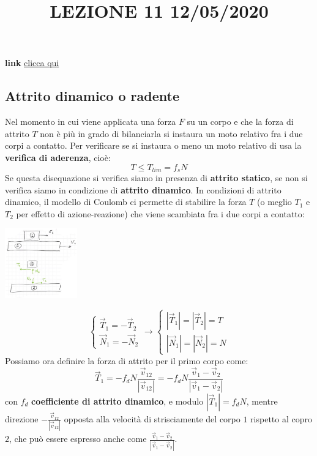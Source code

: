 \title{LEZIONE 11 12/05/2020}\newline
\textbf{link} \href{https://web.microsoftstream.com/video/5bd1efee-fafa-4133-8e33-37fcd8b66da5}{clicca qui}
\subsection{Attrito dinamico o radente}
Nel momento in cui viene applicata una forza $F$ su un corpo e che la forza di attrito $T$ non è più in grado di bilanciarla si instaura un moto relativo fra i due corpi a contatto.\newline
\newline
Per verificare se si instaura o meno un moto relativo di usa la \textbf{verifica di aderenza}, cioè:
\[
    T \leq T_{lim} = f_s N
\]
Se questa disequazione si verifica siamo in presenza di \textbf{attrito statico}, se non si verifica siamo in condizione di \textbf{attrito dinamico}.\newline
\newline
In condizioni di attrito dinamico, il modello di Coulomb ci permette di stabilire la forza $T$ (o meglio $T_1$ e $T_2$ per effetto di azione-reazione) che viene scambiata fra i due corpi a contatto:
\begin{center}
    \includegraphics[height=3cm]{../lezione11/img1.JPG}
\end{center}
\[
    \begin{cases}
        \vec{T}_1 = - \vec{T}_2\\
        \vec{N}_1 = - \vec{N}_2
    \end{cases} \rightarrow \begin{cases}
        |\vec{T}_1| = |\vec{T}_2| = T\\
        |\vec{N}_1| = |\vec{N}_2| = N
    \end{cases}
\]
Possiamo ora definire la forza di attrito per il primo corpo come:
\[
    \vec{T}_1 = - f_d N  \frac{\vec{v}_{12}}{|\vec{v}_{12}|} = - f_d N  \frac{\vec{v}_1 - \vec{v}_2}{|\vec{v}_1 - \vec{v}_2|} 
\]
con $f_d$ \textbf{coefficiente di attrito dinamico}, e modulo $ |\vec{T}_1| = f_d N$, mentre direzione $ - \frac{\vec{v}_{12}}{|\vec{v}_{12}|}$ opposta alla velocità di strisciamente del corpo $1$ rispetto al copro $2$, che può essere espresso anche come $\frac{\vec{v}_1 - \vec{v}_2}{|\vec{v}_1 - \vec{v}_2|}$.\newline
